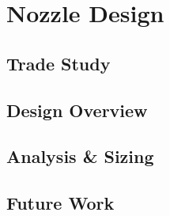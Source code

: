 \section{Nozzle Design}

\subsection{Trade Study}

\subsection{Design Overview}

\subsection{Analysis \& Sizing}

\subsection{Future Work}